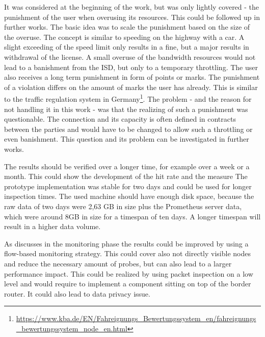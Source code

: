 \documentclass[thesis.tex]{subfiles}
\begin{document}
It was considered at the beginning of the work, but was only lightly covered - the punishment of the user when overusing its resources. This could be followed up in further works. The basic idea was to scale the punishment based on the size of the overuse. The concept is similar to speeding on the highway with a car. A slight exceeding of the speed limit only results in a fine, but a major results in withdrawal of the license. A small overuse of the bandwidth resources would not lead to a banishment from the ISD, but only to a temporary throttling. The user also receives a long term punishment in form of points or marks. The punishment of a violation differs on the amount of marks the user has already. This is similar to the traffic regulation system in Germany\footnote{\url{https://www.kba.de/EN/Fahreignungs_Bewertungssystem_en/fahreignungs_bewertungssystem_node_en.html}}. The problem - and the reason for not handling it in this work - was that the realizing of such a punishment was questionable. The connection and its capacity is often defined in contracts between the parties and would have to be changed to allow such a throttling or even banishment. This question and its problem can be investigated in further works.

The results should be verified over a longer time, for example over a week or a month. This could show the development of the hit rate and the measure The prototype implementation was stable for two days and could be used for longer inspection times. The used machine should have enough disk space, because the raw data of two days were 2,63 GB in size plus the Prometheus server data, which were around 8GB in size for a timespan of ten days. A longer timespan will result in a higher data volume. 

As discusses in the monitoring phase the results could be improved by using a flow-based monitoring strategy. This could cover also not directly visible nodes and reduce the necessary amount of probes, but can also lead to a larger performance impact. This could be realized by using packet inspection on a low level and would require to implement a component sitting on top of the border router. It could also lead to data privacy issue.

\subfilebib %
\end{document}
